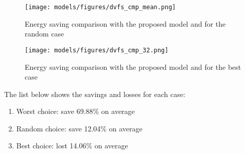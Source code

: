 \begin{figure}[H]
	\centering
	\texttt{[image: models/figures/dvfs\_cmp\_mean.png]}
	\caption{Energy saving comparison with the proposed model and for the random case}
	\label{fig:energy_mean_case}
\end{figure}

\begin{figure}[H]
	\centering
	\texttt{[image: models/figures/dvfs\_cmp\_32.png]}
	\caption{Energy saving comparison with the proposed model and for the best case}
	\label{fig:energy_best_case}
\end{figure}

The list below shows the savings and losses for each case:

\begin{enumerate}
	\item Worst choice: save 69.88\% on average
	\item Random choice: save 12.04\% on average
	\item Best choice: lost 14.06\% on average
\end{enumerate}



